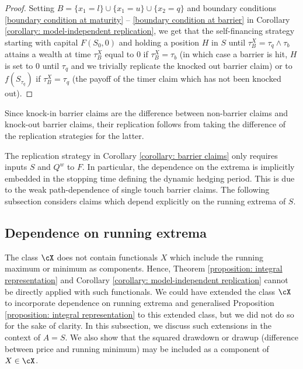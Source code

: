 \documentclass[11pt]{article}
\begin{document}
\begin{proof}

Setting $B = \{x_1 = l\} \cup \{x_1 = u\} \cup \{x_2 = q\}$ and boundary conditions \eqref{boundary condition at maturity} -- \eqref{boundary condition at barrier} in Corollary \ref{corollary: model-independent replication}, we get that the self-financing strategy starting with capital $F(S_0,0)$ and holding a position $H$ in $S$ until $\tau^X_B = \tau_q \wedge \tau_b$ attains a wealth at time $\tau^X_B$ equal to $0$ if $\tau^X_B = \tau_b$ (in which case a barrier is hit, $H$ is set to $0$ until $\tau_q$ and we trivially replicate the knocked out barrier claim) or to $f(S_{\tau_q})$ if $\tau^X_B = \tau_q$ (the payoff of the timer claim which has not been knocked out).

\end{proof}

Since knock-in barrier claims are the difference between non-barrier claims and knock-out barrier claims, their replication follows from taking the difference of the replication strategies for the latter. 

The replication strategy in Corollary \ref{corollary: barrier claims} only requires inputs $S$ and $Q^w$ to $F$. In particular, the dependence on the extrema is implicitly embedded in the stopping time defining the dynamic hedging period. This is due to the weak path-dependence of single touch barrier claims. The following subsection considers claims which depend explicitly on the running extrema of $S$.

\subsection{Dependence on running extrema}
\label{subsection: dependence on running extrema}

The class $\cX$ does not contain functionals $X$ which include the running maximum or minimum as components. Hence, Theorem \ref{proposition: integral representation} and Corollary \ref{corollary: model-independent replication} cannot be directly applied with such functionals.  We could have extended the class $\cX$ to incorporate dependence on running extrema and generalised Proposition \ref{proposition: integral representation} to this extended class, but we did not do so for the sake of clarity. In this subsection, we discuss such extensions in the context of $A = S$. We also show that the squared drawdown or drawup (difference between price and running minimum) may be included as a component of $X \in \cX$.
\end{document}
